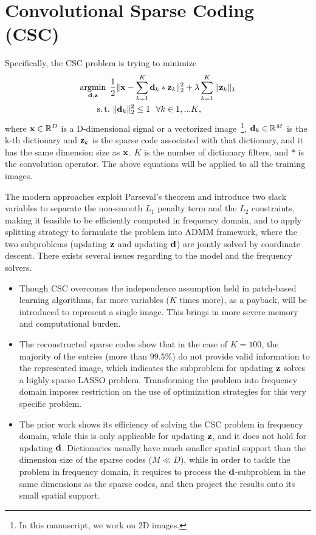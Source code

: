 \section{Convolutional Sparse Coding (CSC)}
Specifically, the CSC problem is trying to minimize
\begin{equation}
\begin{split}
    \minimize{\filter,\code} & \frac{1}{2}\|\signal - \sum_{k=1}^{K} \filter_k * \code_k \|_2^2 + \lambda \sum_{k=1}^{K}\| \code_k \|_1 \\
    \subjectto & ~ \|\filter_k\|^2_2 \leq 1 ~~ \forall k \in {1,...K},
\end{split}
\end{equation}
where $\signal \in \mathbb{R}^D$ is a D-dimensional signal or a vectorized image~\footnote{In this manuscript, we work on 2D images.}, $\filter_k \in \mathbb{R}^M$ is the k-th dictionary and $\code_k$ is the sparse code associated with that dictionary, and it has the same dimension size as $\signal$. $K$ is the number of dictionary filters, and $*$ is the convolution operator. The above equations will be applied to all the training images.

The modern approaches exploit Parseval's theorem and introduce two slack variables to separate the non-smooth $L_1$ penalty term and the $L_2$ constraints, making it feasible to be efficiently computed in frequency domain, and to apply splitting strategy to formulate the problem into ADMM framework, where the two subproblems (updating $\code$ and updating $\filter$) are jointly solved by coordinate descent. There exists several issues regarding to the model and the frequency solvers.

\begin{itemize}
  \item Though CSC overcomes the independence assumption held in patch-based learning algorithms, far more variables ($K$ times more), as a payback, will be introduced to represent a single image. This brings in more severe memory and computational burden.
  \item The reconstructed sparse codes show that in the case of $K=100$, the majority of the entries (more than $99.5\%$) do not provide valid information to the represented image, which indicates the subproblem for updating $\code$ solves a highly sparse LASSO problem. Transforming the problem into frequency domain imposes restriction on the use of optimization strategies for this very specific problem.
  \item The prior work shows its efficiency of solving the CSC problem in frequency domain, while this is only applicable for updating $\code$, and it does not hold for updating $\filter$. Dictionaries usually have much smaller spatial support than the dimension size of the sparse codes ($M \ll D$), while in order to tackle the problem in frequency domain, it requires to process the $\filter$-subproblem in the same dimensions as the sparse codes, and then project the results onto its small spatial support.
\end{itemize}
